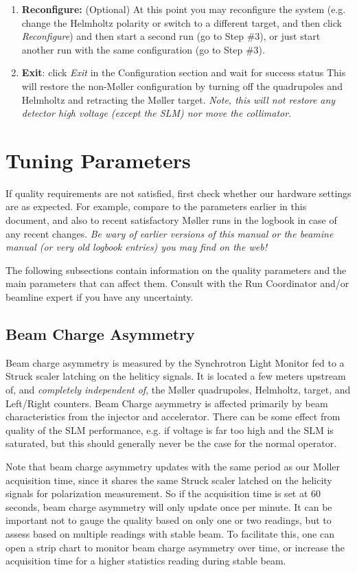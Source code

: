 \documentclass[amsmath,amssymb,notitlepage,12pt]{revtex4}
\begin{document}
\begin{enumerate}
\item {\bf Reconfigure:}  (Optional)  At this point you may reconfigure the system (e.g. change the Helmholtz polarity or switch to a different target, and then click {\em Reconfigure}) and then start a second run (go to Step \#3), or just start another run with the same configuration (go to Step \#3).
\item {\bf Exit}: click {\em Exit} in the Configuration section and wait for success status
    \subitem  This will restore the non-M{\o}ller configuration by turning off the quadrupoles and Helmholtz and retracting the M{\o}ller target.  {\em Note, this will not restore any detector high voltage (except the SLM) nor move the collimator}. 
\end{enumerate}


\section{Tuning Parameters}\label{sec:knobs}
If quality requirements are not satisfied, first check whether our hardware settings are as expected.  For example, compare to the parameters earlier in this document, and also to recent satisfactory M{\o}ller runs in the logbook in case of any recent changes.  {\em Be wary of earlier versions of this manual or the beamine manual (or very old logbook entries) you may find on the web!}

The following subsections contain information on the quality parameters and the main parameters that can affect them.  Consult with the Run Coordinator and/or beamline expert if you have any uncertainty.

\subsection{Beam Charge Asymmetry}
Beam charge asymmetry is measured by the Synchrotron Light Monitor fed to a Struck scaler latching on the heliticy signals.  It is located a few meters upstream of, and {\em completely independent of}, the M{\o}ller quadrupoles, Helmholtz, target, and Left/Right counters.  Beam Charge asymmetry is affected primarily by beam characteristics from the injector and accelerator.  There can be some effect from quality of the SLM performance, e.g. if voltage is far too high and the SLM is saturated, but this should generally never be the case for the normal operator.

Note that beam charge asymmetry updates with the same period as our Moller acquisition time, since it shares the same Struck scaler latched on the helicity signals for polarization measurement.  So if the acquisition time is set at 60 seconds, beam charge asymmetry will only update once per minute.  It can be important not to gauge the quality based on only one or two readings, but to assess based on multiple readings with stable beam.  To facilitate this, one can open a strip chart to monitor beam charge asymmetry over time, or increase the acquisition time for a higher statistics reading during stable beam.
\end{document}

